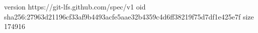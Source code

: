 version https://git-lfs.github.com/spec/v1
oid sha256:27963d21196cf33af9b4493acfe5aae32b4359c4d6ff38219f75d7df1e425e7f
size 174916
